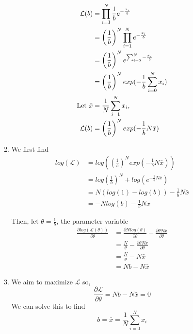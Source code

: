 \documentclass{article}
\begin{document}
\begin{enumerate}
\begin{enumerate}
\begin{align*}
                \mathcal{L}(b) 
                &= \prod_{i = 1}^N \frac{1}{b}e^{-\frac{x_i}{b}}\\
                &= \left(\frac{1}{b}\right)^N \prod_{i=1}^N e^{-\frac{x_i}{b}}\\
                &= \left(\frac{1}{b}\right)^N e^{\sum_{i=0}^N -\frac{x_i}{b}}\\
                &= \left(\frac{1}{b}\right)^N exp(-\frac{1}{b}\sum_{i=0}^N x_i)\\
                \textnormal{Let } \bar{x} &= \frac{1}{N}\sum_{i=1}^Nx_i,\\
                \mathcal{L}(b) &= \left(\frac{1}{b}\right)^N exp(-\frac{1}{b}N\bar{x})
                \end{align*}

            \item %
                We first find
                \begin{align*}
                log(\mathcal{L}) 
                    &= log\left(\left(\frac{1}{b}\right)^N exp(-\frac{1}{b}N\bar{x})\right)\\
                    &= log\left(\frac{1}{b}\right)^N + 
                        log\left(e^{-\frac{1}{b}N\bar{x}}\right)\\
                    &= N(log(1) - log(b)) -\frac{1}{b}N\bar{x}\\
                    &= -Nlog(b) - \frac{1}{b}N\bar{x}
                \end{align*}

                Then, let \(\theta = \frac{1}{b}\), the parameter variable
                \begin{align*}
                    \frac{\partial log(\mathcal{L}(\theta))}{\partial \theta}
                    &= \frac{\partial Nlog(\theta)}{\partial \theta} - 
                    \frac{\partial \theta N\bar{x}}{\partial \theta}\\
                    &= \frac{N}{\theta} - \frac{\partial \theta N\bar{x}}{\partial \theta}\\
                    &= \frac{N}{\theta} - N\bar{x}\\
                    &= Nb - N\bar{x}
                \end{align*}

            \item %
                We aim to maximize \(\mathcal{L}\) so,
                \begin{equation*}
                    \frac{\partial \mathcal{L}}{\partial \theta} = 
                    Nb - N\bar{x} = 0
                \end{equation*}
                We can solve this to find 
                \begin{equation*}
                  b = \bar{x} = \frac{1}{N}\sum_{i=0}^Nx_i
                \end{equation*}
        \end{enumerate}


\end{enumerate}
\end{document}
